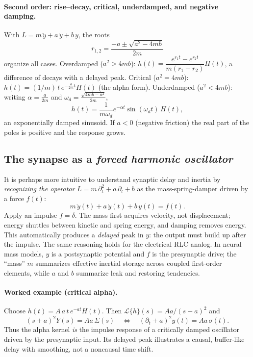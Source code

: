 \paragraph{Second order: rise--decay, critical, underdamped, and negative damping.}
With \(L=m\,\ddot y+a\,\dot y+b\,y\), the roots
\[
r_{1,2}=\frac{-a\pm\sqrt{a^2-4mb}}{2m}
\]
organize all cases. Overdamped (\(a^2>4mb\)): \(h(t)=\dfrac{e^{r_1 t}-e^{r_2 t}}{m(r_1-r_2)}H(t)\), a difference of decays with a delayed peak. Critical (\(a^2=4mb\)): \(h(t)=(1/m)\,t\,e^{-\frac{a}{2m}t}H(t)\) (the alpha form). Underdamped (\(a^2<4mb\)): writing \(\alpha=\frac{a}{2m}\) and \(\omega_d=\frac{\sqrt{4mb-a^2}}{2m}\),
\[
h(t)=\frac{1}{m\omega_d}e^{-\alpha t}\sin(\omega_d t)\,H(t),
\]
an exponentially damped sinusoid. If \(a<0\) (negative friction) the real part of the poles is positive and the response grows.

\subsection{The synapse as a \emph{forced harmonic oscillator}}
It is perhaps more intuitive to understand synaptic delay and inertia by \emph{recognizing the operator} \(L=m\,\partial_t^2+a\,\partial_t+b\) as the mass-spring-damper driven by a force \(f(t)\):
\[
m\,\ddot y(t)+a\,\dot y(t)+b\,y(t)=f(t).
\]
Apply an impulse \(f=\delta\). The mass first acquires velocity, not displacement; energy shuttles between kinetic and spring energy, and damping removes energy. This automatically produces a \emph{delayed} peak in \(y\): the output must build up after the impulse. The same reasoning holds for the electrical RLC analog. In neural mass models, \(y\) is a postsynaptic potential and \(f\) is the presynaptic drive; the ``mass'' \(m\) summarizes effective inertial storage across coupled first‑order elements, while \(a\) and \(b\) summarize leak and restoring tendencies.

\paragraph{Worked example (critical alpha).}
Choose \(h(t)=A\,a\,t\,e^{-a t}H(t)\). Then \(\mathcal{L}\{h\}(s)=A a/(s+a)^2\) and
\[
(s+a)^2 Y(s)=A a\,\Sigma(s)\quad\Longleftrightarrow\quad (\partial_t+a)^2 y(t)=A a\,\sigma(t).
\]
Thus the alpha kernel \emph{is} the impulse response of a critically damped oscillator driven by the presynaptic input. Its delayed peak illustrates a causal, buffer‑like delay with smoothing, not a noncausal time shift.

